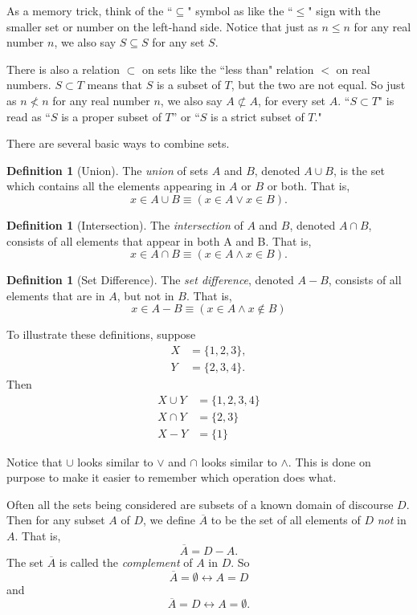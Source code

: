 \documentclass[11pt,oneside]{book}
\theoremstyle{definition}
\newtheorem{defn}[thm]{Definition}
\begin{document}
As a memory trick, think of the ``$\subseteq$" symbol as like the ``$\leq$" sign with the smaller set or number on the left-hand side.
Notice that just as $n \leq n$ for any real number $n$, we also say $S \subseteq S$ for any set $S$.

There is also a relation $\subset$ on sets like the ``less than" relation $<$ on real numbers.
$S \subset T$ means that $S$ is a subset of $T$, but the two are not equal.
So just as $n \not< n$ for any real number $n$, we also say $A \not\subset A$, for every set $A$.
``$S \subset T$" is read as ``$S$ is a proper subset of $T$” or ``$S$ is a strict subset of $T$."

There are several basic ways to combine sets.

\begin{defn}[Union]
    The \emph{union} of sets $A$ and $B$, denoted $A \cup B$, is the set which contains all the elements
    appearing in $A$ or $B$ or both.
    That is,
    \[ x \in A \cup B \equiv (x \in A \lor x \in B). \]
\end{defn}

\begin{defn}[Intersection]
    The \emph{intersection} of $A$ and $B$, denoted $A \cap B$, consists of all elements that appear in both A and B.
    That is,
    \[ x \in A \cap B \equiv (x \in A \land x \in B). \]
\end{defn}

\begin{defn}[Set Difference]
    The \emph{set difference}, denoted $A - B$, consists of all elements that are in $A$, but not in $B$. That is,
    \[ x \in A - B \equiv (x \in A \land x \not\in B) \]
\end{defn}

To illustrate these definitions, suppose
\begin{align*}
    X &= \{ 1, 2, 3 \}, \\
    Y &= \{ 2, 3, 4 \}.
\end{align*}
Then
\begin{align*}
    X \cup Y &= \{ 1, 2, 3, 4 \} \\
    X \cap Y &= \{ 2, 3 \} \\
    X - Y &= \{ 1 \}
\end{align*}

Notice that $\cup$ looks similar to $\lor$ and $\cap$ looks similar to $\land$.
This is done on purpose to make it easier to remember which operation does what.

Often all the sets being considered are subsets of a known domain of discourse
$D$.
Then for any subset $A$ of $D$, we define $\overline{A}$ to be the set of all elements of $D$ \emph{not} in $A$.
That is,
\[ \overline{A} = D - A. \]
The set $\overline{A}$ is called the \emph{complement} of $A$ in $D$.
So
\[ \overline{A} = \emptyset \leftrightarrow A = D \]
and
\[ \overline{A} = D \leftrightarrow A = \emptyset. \]
\end{document}
